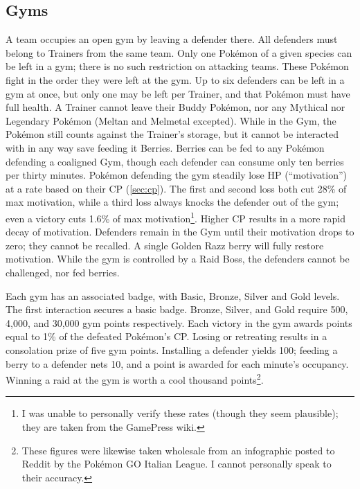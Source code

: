 \subsection{Gyms\label{sec:gyms}}
A team occupies an open gym by leaving a defender there.
All defenders must belong to Trainers from the same team.
Only one Pokémon of a given species can be left in a gym; there is no
  such restriction on attacking teams.
These Pokémon fight in the order they were left at the gym.
Up to six defenders can be left in a gym at once, but only one
  may be left per Trainer, and that Pokémon must have full health.
A Trainer cannot leave their Buddy Pokémon, nor any Mythical nor Legendary
  Pokémon (Meltan and Melmetal excepted).
While in the Gym, the Pokémon still counts against the Trainer's storage,
  but it cannot be interacted with in any way save feeding it Berries.
Berries can be fed to any Pokémon defending a coaligned Gym, though
  each defender can consume only ten berries per thirty minutes.
Pokémon defending the gym steadily lose HP (``motivation'') at a rate
  based on their CP (\autoref{sec:cp}).
The first and second loss both cut 28\% of max motivation, while
  a third loss always knocks the defender out of the gym;
  even a victory cuts 1.6\% of max motivation\footnote{I was unable to personally verify these rates (though they seem plausible); they are taken from the GamePress wiki.}.
Higher CP results in a more rapid decay of motivation.
Defenders remain in the Gym until their motivation drops to zero; they cannot be recalled.
A single Golden Razz berry will fully restore motivation.
While the gym is controlled by a Raid Boss, the defenders cannot be challenged,
  nor fed berries.

Each gym has an associated badge, with Basic, Bronze, Silver and Gold levels.
The first interaction secures a basic badge.
Bronze, Silver, and Gold require 500, 4,000, and 30,000 gym points respectively.
Each victory in the gym awards points equal to 1\% of the defeated Pokémon's CP.
Losing or retreating results in a consolation prize of five gym points.
Installing a defender yields 100; feeding a berry to a defender nets 10,
 and a point is awarded for each minute's occupancy.
Winning a raid at the gym is worth a cool thousand points\footnote{These figures were likewise taken wholesale from an
 infographic posted to Reddit by the Pokémon GO Italian League. I cannot personally speak to their accuracy.}.

